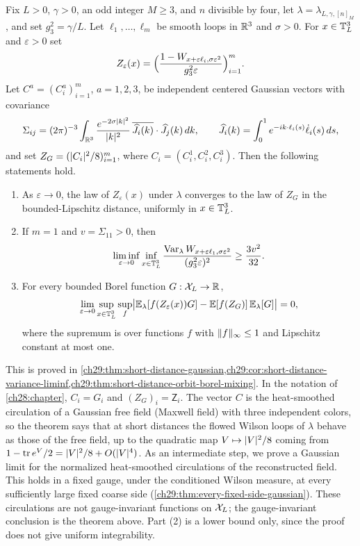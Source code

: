 \begin{theorem}\label{s2:thm:short-distance}
Fix $L>0$, $\gamma>0$, an odd integer $M\ge3$, and $n$ divisible by four, let $\lambda=\lambda_{L,\gamma,[n]_M}$, and set $g_3^2=\gamma/L$. Let $\ell_1,\dots,\ell_m$ be smooth loops in $\mathbb R^3$ and $\sigma>0$. For $x\in\mathbb T_L^3$ and $\varepsilon>0$ set
\[
 Z_\varepsilon(x)=\Bigl(\frac{1-W_{x+\varepsilon\ell_i,\sigma\varepsilon^2}}{g_3^2\varepsilon}\Bigr)_{i=1}^m.
\]
Let $C^a=(C^a_i)_{i=1}^m$, $a=1,2,3$, be independent centered Gaussian vectors with covariance
\begin{equation}\label{s2:eq:circulation-covariance}
 \Sigma_{ij}=(2\pi)^{-3}\int_{\mathbb R^3}\frac{e^{-2\sigma\lvert k\rvert^2}}{\lvert k\rvert^2}\,\overline{\widehat J_i(k)}\cdot\widehat J_j(k)\,dk,\qquad
 \widehat J_i(k)=\int_0^1e^{-ik\cdot\ell_i(s)}\dot\ell_i(s)\,ds,
\end{equation}
and set $Z_G=(\lvert C_i\rvert^2/8)_{i=1}^m$, where $C_i=(C_i^1,C_i^2,C_i^3)$. Then the following statements hold.
\begin{enumerate}
\item As $\varepsilon\to0$, the law of $Z_\varepsilon(x)$ under $\lambda$ converges to the law of $Z_G$ in the bounded-Lipschitz distance, uniformly in $x\in\mathbb T_L^3$.
\item If $m=1$ and $v=\Sigma_{11}>0$, then
\[
 \liminf_{\varepsilon\to0}\inf_{x\in\mathbb T_L^3}\frac{\operatorname{Var}_\lambda W_{x+\varepsilon\ell_1,\sigma\varepsilon^2}}{(g_3^2\varepsilon)^2}\ge\frac{3v^2}{32}.
\]
\item For every bounded Borel function $G:\mathcal X_L\to\mathbb R$,
\[
 \lim_{\varepsilon\to0}\sup_{x\in\mathbb T_L^3}\sup_f\bigl\lvert\mathbb E_\lambda[f(Z_\varepsilon(x))G]-\mathbb E[f(Z_G)]\,\mathbb E_\lambda[G]\bigr\rvert=0,
\]
where the supremum is over functions $f$ with $\lVert f\rVert_\infty\le1$ and Lipschitz constant at most one.
\end{enumerate}
\end{theorem}

This is proved in \cref{ch29:thm:short-distance-gaussian,ch29:cor:short-distance-variance-liminf,ch29:thm:short-distance-orbit-borel-mixing}. In the notation of \cref{ch28:chapter}, $C_i=G_i$ and $(Z_G)_i=\mathsf Z_i$. The vector $C$ is the heat-smoothed circulation of a Gaussian free field (Maxwell field) with three independent colors, so the theorem says that at short distances the flowed Wilson loops of $\lambda$ behave as those of the free field, up to the quadratic map $V\mapsto\lvert V\rvert^2/8$ coming from $1-\operatorname{tr} e^V/2=\lvert V\rvert^2/8+O(\lvert V\rvert^4)$. As an intermediate step, we prove a Gaussian limit for the normalized heat-smoothed circulations of the reconstructed field. This holds in a fixed gauge, under the conditioned Wilson measure, at every sufficiently large fixed coarse side (\cref{ch29:thm:every-fixed-side-gaussian}). These circulations are not gauge-invariant functions on $\mathcal X_L$; the gauge-invariant conclusion is the theorem above. Part (2) is a lower bound only, since the proof does not give uniform integrability.

